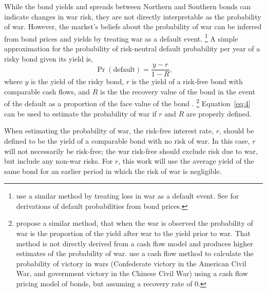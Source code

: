 \documentclass[]{article}\usepackage[]{graphicx}\usepackage[]{color}
\begin{document}
While the bond yields and spreads between Northern and Southern bonds can indicate changes in war risk, they are not directly interpretable as the probability of war.
However, the market's beliefs about the probability of war can be inferred from bond prices and yields by treating war as a default event.%
\footnote{
  \textcite{HaberMitchenerOosterlinckEtAl2015} use a similar method by treating loss in war as a default event. 
  See \textcites{Fons1987}{Merrick2001}{Chan-Lau2006} for derivations of default probabilities from bond prices.
}
A simple approximation for the probability of risk-neutral default probability per year of a risky bond given its yield is,
\begin{equation}
  \label{eq:4}
  \Pr(\text{default}) = \frac{y - r}{1 - R} \text{,}
\end{equation}
where $y$ is the yield of the risky bond, $r$ is the yield of a risk-free bond with comparable cash flows, and $R$ is the the recovery value of the bond in the event of the default as a proportion of the face value of the bond \parencite{HullPredescuWhite2004}.%
\footnote{\textcite[115]{WaldenstromFrey2008} propose a similar method, that when the war is observed the probability of war is the proportion of the yield after war to the yield prior to war.
  That method is not directly derived from a cash flow model and produces higher estimates of the probability of war.
  \textcite{HaberMitchenerOosterlinckEtAl2015} use a cash flow method to calculate the probability of victory in wars (Confederate victory in the American Civil War, and government victory in the Chinese Civil War) using a cash flow pricing model of bonds, but assuming a recovery rate of 0.
}
Equation~\eqref{eq:4} can be used to estimate the probability of war if $r$ and $R$ are properly defined.

When estimating the probability of war, the risk-free interest rate, $r$, should be defined to be the yield of a comparable bond with no risk of war.
In this case, $r$ will not necessarily be risk-free; the war risk-free should exclude risk due to war, but include any non-war risks.
For $r$, this work will use the average yield of the same bond for an earlier period in which the risk of war is negligible.
\end{document}
